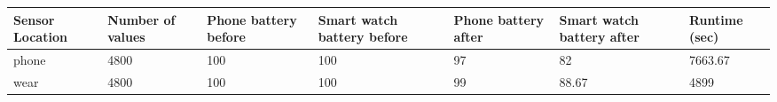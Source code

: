 \begin{center}
  \begin{tabular}{ |p{3cm}|p{1.5cm}|p{1.5cm}|p{1.5cm}|p{1.5cm}|p{1.5cm}|p{1.5cm}|}
  \hline
Sensor Location &Number of values &	Phone battery before &	Smart watch battery before &	Phone battery after	& Smart watch battery after &	Runtime (sec) \\
  \hline
phone	&  4800	& 100	&100	&97	 &82	&7663.67 \\
wear	 & 4800	&100	&100	&99	 &88.67	&4899 \\
  \hline
  \end{tabular}
    \label{tab:title8} 
\end{center}
